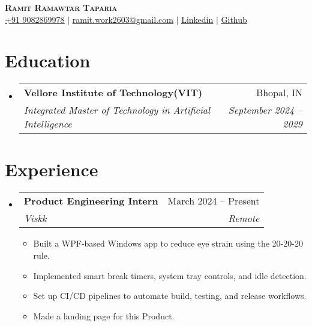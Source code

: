 \documentclass[letterpaper,11pt]{article}
\makeatletter
\newcommand{\resumeItem}[1]{
  \item\small{
    {#1 \vspace{-2pt}}
  }
}
\newcommand{\resumeSubheading}[4]{
  \vspace{-2pt}\item
    \begin{tabular*}{0.97\textwidth}[t]{l@{\extracolsep{\fill}}r}
      \textbf{#1} & #2 \\
      \textit{\small#3} & \textit{\small #4} \\
    \end{tabular*}\vspace{-7pt}
}
\newcommand{\resumeSubHeadingListStart}{\begin{itemize}[leftmargin=0.15in, label={}]}
\newcommand{\resumeSubHeadingListEnd}{\end{itemize}}
\newcommand{\resumeItemListStart}{\begin{itemize}}
\newcommand{\resumeItemListEnd}{\end{itemize}\vspace{-5pt}}
\makeatother
\begin{document}
\begin{center}
    \textbf{\Huge \scshape Ramit Ramawtar Taparia} \\ \vspace{1pt}
    \href{tel:+919082869978}{\underline{+91 9082869978}} $|$ \href{mailto:ramit.work2603@gmail.com}{\underline{ramit.work2603@gmail.com}} $|$ 
    \href{www.linkedin.com/in/ramit-taparia/}{\underline{Linkedin}} $|$
    \href{https://github.com/foundRamit}{\underline{Github}}
\end{center}

\section{Education}
  \resumeSubHeadingListStart
    \resumeSubheading
      {Vellore Institute of Technology(VIT) }{Bhopal, IN}
      {Integrated Master of Technology in Artificial Intelligence}{September 2024 -- 2029}
  \resumeSubHeadingListEnd

\section{Experience}
  \resumeSubHeadingListStart
   \resumeSubheading
      {Product Engineering Intern}{March 2024 -- Present}
      {Viskk}{Remote}
      \resumeItemListStart
       \resumeItem{Built a WPF-based Windows app to reduce eye strain using the 20-20-20 rule.}
        \resumeItem{Implemented smart break timers, system tray controls, and idle detection.}
        \resumeItem{Set up CI/CD pipelines to automate build, testing, and release workflows.}
        \resumeItem{Made a landing page for this Product.}
      \resumeItemListEnd
  \resumeSubHeadingListEnd

\end{document}
